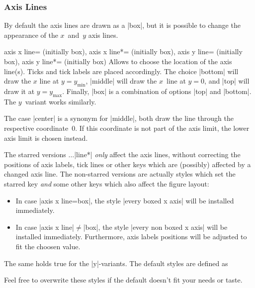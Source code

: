 \subsubsection{Axis Lines}
By default the axis lines are drawn as a |box|, but it is possible to change the appearance of the $x$~and~$y$ axis lines.

\begin{pgfplotskeylist}{
	axis x line= (initially box),
	axis x line*= (initially box),
	axis y line= (initially box),
	axis y line*= (initially box)}
Allows to choose the location of the axis line(s). Ticks and tick labels are placed accordingly.
The choice |bottom| will draw the $x$ line at $y=y_\text{min}$, |middle| will draw the $x$~line at $y=0$, and |top| will draw it at $y=y_\text{max}$. Finally, |box| is a combination of options |top| and |bottom|. The $y$~variant works similarly.

The case |center| is a synonym for |middle|, both draw the line through the respective coordinate~$0$. If this coordinate is not part of the axis limit, the lower axis limit is chosen instead.

The starred versions $\dotsc$|line*| \emph{only} affect the axis lines, without correcting the positions of axis labels, tick lines or other keys which are (possibly) affected by a changed axis line. The non-starred versions are actually styles which set the starred key \emph{and} some other keys which also affect the figure layout:
\begin{itemize}
	\item In case |axis x line=box|, the style |every boxed x axis| will be installed immediately.
	\item In case |axis x line|$\neq$|box|, the style |every non boxed x axis| will be installed immediately. Furthermore, axis labels positions will be adjusted to fit the choosen value.
\end{itemize}
The same holds true for the |y|-variants. The default styles are defined as
\begin{codeexample}
\end{codeexample}
Feel free to overwrite these styles if the default doesn't fit your needs or taste. 


\end{pgfplotskeylist}
